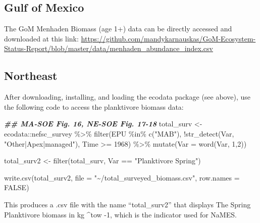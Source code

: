 \documentclass[
]{book}
\newenvironment{Shaded}{\begin{snugshade}}{\end{snugshade}}
\newcommand{\AttributeTok}[1]{\textcolor[rgb]{0.77,0.63,0.00}{#1}}
\newcommand{\ConstantTok}[1]{\textcolor[rgb]{0.00,0.00,0.00}{#1}}
\newcommand{\DecValTok}[1]{\textcolor[rgb]{0.00,0.00,0.81}{#1}}
\newcommand{\DocumentationTok}[1]{\textcolor[rgb]{0.56,0.35,0.01}{\textbf{\textit{#1}}}}
\newcommand{\FunctionTok}[1]{\textcolor[rgb]{0.00,0.00,0.00}{#1}}
\newcommand{\NormalTok}[1]{#1}
\newcommand{\OtherTok}[1]{\textcolor[rgb]{0.56,0.35,0.01}{#1}}
\newcommand{\SpecialCharTok}[1]{\textcolor[rgb]{0.00,0.00,0.00}{#1}}
\newcommand{\StringTok}[1]{\textcolor[rgb]{0.31,0.60,0.02}{#1}}
\begin{document}
\hypertarget{gulf-of-mexico-1}{%
\subsection{Gulf of Mexico}\label{gulf-of-mexico-1}}

The GoM Menhaden Biomass (age 1+) data can be directly accessed and downloaded at this link: \url{https://github.com/mandykarnauskas/GoM-Ecosystem-Status-Report/blob/master/data/menhaden_abundance_index.csv}

\hypertarget{northeast-1}{%
\subsection{Northeast}\label{northeast-1}}

After downloading, installing, and loading the ecodata package (see above), use the following code to access the planktivore biomass data:

\begin{Shaded}
\begin{Highlighting}[]
\DocumentationTok{\#\# MA{-}SOE Fig. 16, NE{-}SOE Fig. 17{-}18}
\NormalTok{total\_surv }\OtherTok{\textless{}{-}}\NormalTok{ ecodata}\SpecialCharTok{::}\NormalTok{nefsc\_survey }\SpecialCharTok{\%\textgreater{}\%}
  \FunctionTok{filter}\NormalTok{(EPU }\SpecialCharTok{\%in\%} \FunctionTok{c}\NormalTok{(}\StringTok{"MAB"}\NormalTok{),}
         \SpecialCharTok{!}\FunctionTok{str\_detect}\NormalTok{(Var, }\StringTok{"Other|Apex|managed"}\NormalTok{),}
\NormalTok{         Time }\SpecialCharTok{\textgreater{}=} \DecValTok{1968}\NormalTok{) }\SpecialCharTok{\%\textgreater{}\%}
  \FunctionTok{mutate}\NormalTok{(}\AttributeTok{Var =} \FunctionTok{word}\NormalTok{(Var, }\DecValTok{1}\NormalTok{,}\DecValTok{2}\NormalTok{))}

\NormalTok{total\_surv2 }\OtherTok{\textless{}{-}} \FunctionTok{filter}\NormalTok{(total\_surv, Var }\SpecialCharTok{==} \StringTok{"Planktivore Spring"}\NormalTok{)}

\FunctionTok{write.csv}\NormalTok{(total\_surv2, }\AttributeTok{file =} \StringTok{"\textasciitilde{}/total\_surveyed\_biomass.csv"}\NormalTok{, }\AttributeTok{row.names =} \ConstantTok{FALSE}\NormalTok{)}
\end{Highlighting}
\end{Shaded}

This produces a .csv file with the name ``total\_surv2'' that displays The Spring Planktivore biomass in kg \^{}tow -1, which is the indicator used for NaMES.
\end{document}
